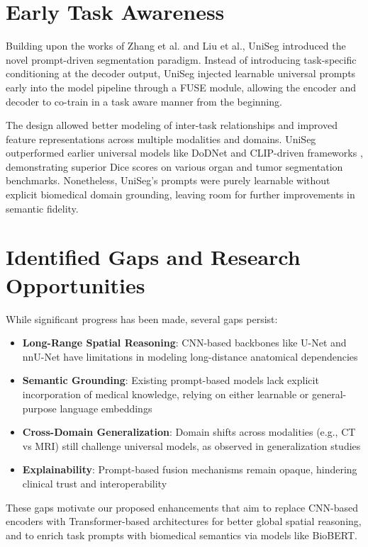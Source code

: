\documentclass{cls/iutbscthesis}
\begin{document}
\section{Early Task Awareness}
Building upon the works of Zhang et al. and Liu et al., UniSeg \cite{ye2023uniseg} introduced the novel prompt-driven segmentation paradigm. Instead of introducing task-specific conditioning at the decoder output, UniSeg injected learnable universal prompts early into the model pipeline through a FUSE module, allowing the encoder and decoder to co-train in a task aware manner from the beginning.
\par
The design allowed better modeling of inter-task relationships and improved feature representations across multiple modalities and domains. UniSeg outperformed earlier universal models like DoDNet \cite{zhang2021dodnet} and CLIP-driven frameworks \cite{liu2023clip}, demonstrating superior Dice scores on various organ and tumor segmentation benchmarks. Nonetheless, UniSeg's prompts were purely learnable without explicit biomedical domain grounding, leaving room for further improvements in semantic fidelity.

\section{Identified Gaps and Research Opportunities}
While significant progress has been made, several gaps persist:
\begin{itemize}
    \item \textbf{Long-Range Spatial Reasoning}: CNN-based backbones like U-Net and nnU-Net have limitations in modeling long-distance anatomical dependencies
    \item \textbf{Semantic Grounding}: Existing prompt-based models lack explicit incorporation of medical knowledge, relying on either learnable or general-purpose language embeddings
    \item \textbf{Cross-Domain Generalization}:  Domain shifts across modalities (e.g., CT vs MRI) still challenge universal models, as observed in generalization studies
    \item \textbf{Explainability}: Prompt-based fusion mechanisms remain opaque, hindering clinical trust and interoperability
\end{itemize}

These gaps motivate our proposed enhancements that aim to replace CNN-based encoders with Transformer-based architectures for better global spatial reasoning, and to enrich task prompts with biomedical semantics via models like BioBERT.
\end{document}
